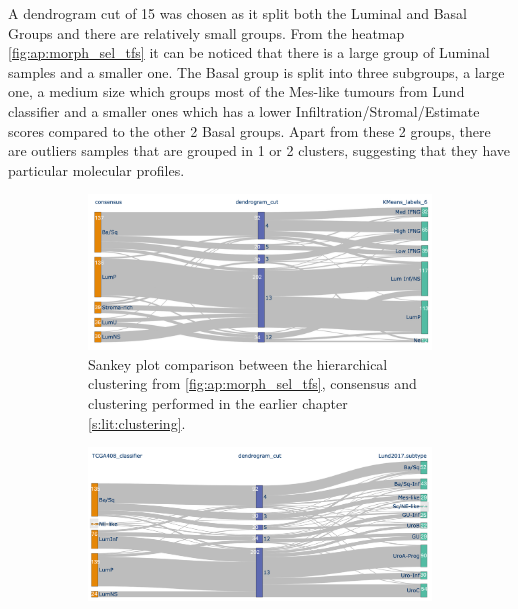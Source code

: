 A dendrogram cut of 15 was chosen as it split both the Luminal and Basal Groups and there are relatively small groups. From the heatmap \cref{fig:ap:morph_sel_tfs} it can be noticed that there is a large group of Luminal samples and a smaller one. The Basal group is split into three subgroups, a large one, a medium size which groups most of the Mes-like tumours from Lund classifier and a smaller ones which has a lower Infiltration/Stromal/Estimate scores compared to the other 2 Basal groups. Apart from these 2 groups, there are outliers samples that are grouped in 1 or 2 clusters, suggesting that they have particular molecular profiles.

\begin{figure}[!t]
\centering
    \captionsetup[subfigure]{justification=Centering}
\begin{subfigure}[!t]{0.49\textwidth}
    \includegraphics[width=1.0\textwidth,height=1.0\textheight,keepaspectratio]{Sections/Network_I/Resources/selective_pruning/sankey_sel_tfs_VU_CS.png}
    
    \caption{Sankey plot comparison between the hierarchical clustering from \cref{fig:ap:morph_sel_tfs}, consensus \cite{Kamoun2020-tj} and clustering performed in the earlier chapter \cref{s:lit:clustering}.}
    
    \label{fig:N_I:sankey_sel_tfs_vuCs}
\end{subfigure}
\hfil %
\begin{subfigure}[!t]{0.49\textwidth}
    \includegraphics[width=1.0\textwidth,height=1.0\textheight,keepaspectratio]{Sections/Network_I/Resources/selective_pruning/sankey_sel_tfs.png}
    

\end{subfigure}
\end{figure}
